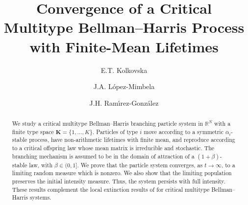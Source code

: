 \documentclass[reqno,final,11pt]{amsart}
\newcommand{\1}{\mathbbm{1}}
\renewcommand{\cite}{\citet}
\theoremstyle{plain}
\theoremstyle{definition}
\theoremstyle{remark}
\begin{document}
\title[Critical multitype Bellman--Harris processes with finite-mean lifetimes]
{Convergence of a Critical Multitype Bellman--Harris Process with Finite-Mean Lifetimes}

\author{E.T. Kolkovska}
\address{Centro de Investigaci\'{o}n en Matem\'{a}ticas, Guanajuato, Mexico.}

\author{J.A. L\'{o}pez-Mimbela}
\address{Centro de Investigaci\'{o}n en Matem\'{a}ticas, Guanajuato, Mexico.}

\author{J.H. Ram\'{\i}rez-Gonz\'{a}lez}
\address{Universidade de S\~ao Paulo, Brasil}






\begin{abstract}
We study a critical multitype Bellman--Harris branching particle system in
\(\mathbb R^N\) with a finite type space \(\mathbf K=\{1,\dots,K\}\). Particles of type \(i\)
move according to a symmetric \(\alpha_i\)-stable process, have non-arithmetic lifetimes with
finite mean, and reproduce according to a critical offspring law whose mean matrix is
irreducible and stochastic. The branching mechanism is assumed to be in the domain of
attraction of a \((1+\beta)\)-stable law, with \(\beta\in(0,1]\). We prove that the particle
system converges, as \(t\to\infty\), to a limiting random measure which is nonzero. We also
show that the limiting population preserves the initial intensity measure. Thus, the system
persists with full intensity. These results complement the local extinction results of
\cite{Kevei} for critical multitype Bellman--Harris systems.
\end{abstract}



\maketitle

\begingroup
\renewcommand{\thefootnote}{}
\endgroup
\end{document}
